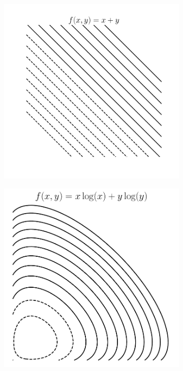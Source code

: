 \begin{figure}[t]
\begin{subfigure}{0.325\textwidth}
\includegraphics[height=1.02\linewidth]{ebookML_src/src/convexity/linear_2d.pdf}
\caption{}
\label{fig:16_contoursd}
\end{subfigure}
\begin{subfigure}{0.325\textwidth}
\includegraphics[height=1.02\linewidth]{ebookML_src/src/convexity/NE.pdf}

\end{subfigure}
\end{figure}
